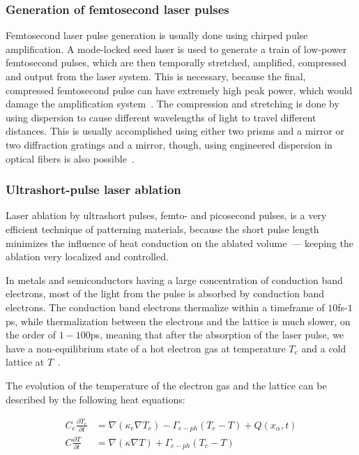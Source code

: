     \subsubsection{Generation of femtosecond laser pulses}
            Femtosecond laser pulse generation is usually done using chirped pulse amplification. A mode-locked seed laser is used
        to generate a train of low-power femtosecond pulses, which are then temporally stretched, amplified, compressed and output
        from the laser system. This is necessary, because the final, compressed femtosecond pulse can have extremely high peak power,
        which would damage the amplification system~\cite{harilal2014femtosecond}.
            The compression and stretching is done by using dispersion to cause different wavelengths of light to travel different distances.
        This is usually accomplished using either two prisms and a mirror or two diffraction gratings and a mirror, though, using engineered
        dispersion in optical fibers is also possible~\cite{harilal2014femtosecond}.

    \subsubsection{Ultrashort-pulse laser ablation}
            Laser ablation by ultrashort pulses, femto- and picosecond pulses, is a very efficient technique of patterning materials, because
        the short pulse length minimizes the influence of heat conduction on the ablated volume~--- keeping the ablation very localized and
        controlled.

            In metals and semiconductors having a large concentration of conduction band electrons, most of the light from the pulse is
        absorbed by conduction band electrons. The conduction band electrons thermalize within a timeframe of $10$fs-$1$ps, while thermalization
        between the electrons and the lattice is much slower, on the order of $1-100$ps, meaning that after the absorption of the laser pulse,
        we have a non-equilibrium state of a hot electron gas at temperature $T_e$ and a cold lattice at $T$~\cite{bauerle2013laser}.

        The evolution of the temperature of the electron gas and the lattice can be described by the following heat equations:

        \begin{align}
            C_e \frac{\partial T_e}{\partial t} &= \nabla (\kappa_e \nabla T_e) - \Gamma_{e-ph}(T_e - T) + Q(x_\alpha, t) \label{ablation:e-heat} \\
            C \frac{\partial T}{\partial t} &= \nabla (\kappa \nabla T) + \Gamma_{e-ph}(T_e - T) \label{ablation:heat}
        \end{align}

